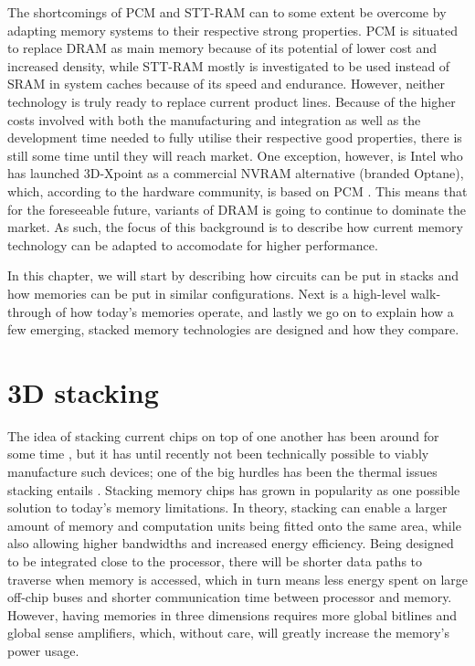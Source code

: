 The shortcomings of PCM and STT-RAM can to some extent be overcome by adapting memory systems to their respective strong properties. PCM is situated to replace DRAM as main memory because of its potential of lower cost and increased density, while STT-RAM mostly is investigated to be used instead of SRAM in system caches because of its speed and endurance. However, neither technology is truly ready to replace current product lines. Because of the higher costs involved with both the manufacturing and integration as well as the development time needed to fully utilise their respective good properties, there is still some time until they will reach market. One exception, however, is Intel who has launched 3D-Xpoint as a commercial NVRAM alternative (branded Optane), which, according to the hardware community, is based on PCM \cite{jeongdong_2017}. This means that for the foreseeable future, variants of DRAM is going to continue to dominate the market. As such, the focus of this background is to describe how current memory technology can be adapted to accomodate for higher performance.
\bigskip

In this chapter, we will start by describing how circuits can be put in stacks and how memories can be put in similar configurations. Next is a high-level walk-through of how today's memories operate, and lastly we go on to explain how a few emerging, stacked memory technologies are designed and how they compare. 

\section{3D stacking}
The idea of stacking current chips on top of one another has been around for some time \cite{lee2000three, jacob2005predicting, black2006stacking}, but it has until recently not been technically possible to viably manufacture such devices; one of the big hurdles has been the thermal issues stacking entails \cite{5074080}. Stacking memory chips has grown in popularity as one possible solution to today's memory limitations. In theory, stacking can enable a larger amount of memory and computation units being fitted onto the same area, while also allowing higher bandwidths and increased energy efficiency\cite{Lee:2016:SMA:2836331.2832911}. Being designed to be integrated close to the processor, there will be shorter data paths to traverse when memory is accessed, which in turn means less energy spent on large off-chip buses and shorter communication time between processor and memory. However, having memories in three dimensions requires more global bitlines and global sense amplifiers, which, without care, will greatly increase the memory's power usage.
\bigskip


